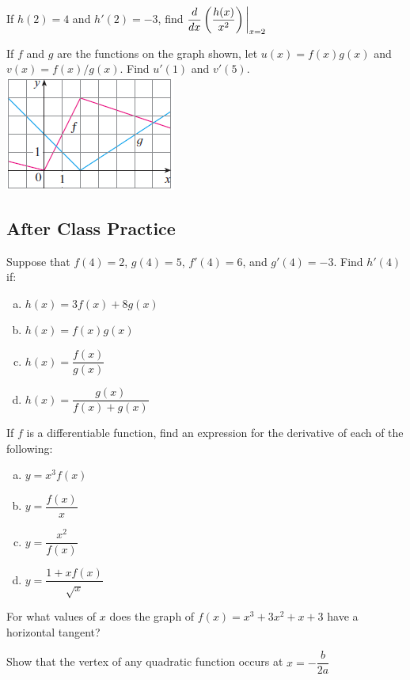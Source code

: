 \documentclass[notes]{subfiles}
\begin{document}
		\begin{ex}
			If \(h(2) = 4\) and \(h'(2) = -3\), find \(\dfrac{d}{dx} \left( \dfrac{h(x)}{x^2}\right)\bigg\rvert_{x = 2}\)
		\end{ex}
		
		\begin{ex}
			If \(f\) and \(g\) are the functions on the graph shown, let \(u(x) = f(x)g(x)\) and \(v(x) = f(x)/g(x)\).  Find \(u'(1)\) and \(v'(5)\).\\
			\includegraphics{3.3fig1}
		\end{ex}	
			\newpage
	
	\subsection*{After Class Practice}		
		\begin{ex}
			Suppose that \(f(4) = 2\), \(g(4) = 5\), \(f'(4) = 6\), and \(g'(4) = -3\).  Find \(h'(4)\) if:
			\begin{enumerate}[(a)]
				\item \(h(x) = 3f(x) + 8g(x)\)
				
				\item \(h(x) = f(x)g(x)\)
					
				\item \(h(x) = \dfrac{f(x)}{g(x)}\)
					
				\item \(h(x) = \dfrac{g(x)}{f(x) + g(x)}\)
			\end{enumerate}
		\end{ex}
		
		\begin{ex}
			If \(f\) is a differentiable function, find an expression for the derivative of each of the following:
			\begin{enumerate}[(a)]
				\item \(y = x^3f(x)\)
					\vs{1}
					
				\item \(y = \dfrac{f(x)}{x}\)
					\vs{1}
					\newpage
					
				\item \(y = \dfrac{x^2}{f(x)}\)
					\vs{1}
					
				\item \(y = \dfrac{1 + xf(x)}{\sqrt{x}}\)
					\vs{1}
			\end{enumerate}
		\end{ex}
		
		\begin{ex}
			For what values of \(x\) does the graph of \(f(x) = x^3 + 3x^2 + x + 3\) have a horizontal tangent?
		\end{ex}
			
		\begin{ex}
			Show that the vertex of any quadratic function occurs at \(x=-\dfrac{b}{2a}\)
		\end{ex}
	

\clearpage
\end{document}
